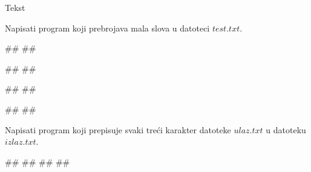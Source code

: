 \begin{Exercise}[label=v3_06] 
Tekst
\end{Exercise}
\begin{Answer}[ref=v3_06]
\end{Answer}







\begin{Exercise}[label=p3_] 
Napisati program koji prebrojava mala slova u datoteci $test.txt$. \\
\begin{miditest}
\begin{upotreba}{1}
##
##

#\naslovIzlaz#
##
\end{upotreba}
\end{miditest}
\begin{miditest}
\begin{upotreba}{2}
##
##

#\naslovIzlaz#
##
\end{upotreba}
\end{miditest}
\end{Exercise}
\begin{Answer}[ref=p3_]
\end{Answer}

\begin{Exercise}[label=p3_] 
Napisati program koji prepisuje svaki treći karakter datoteke $ulaz.txt$ u datoteku $izlaz.txt$.\\
\begin{miditest}
\begin{upotreba}{1}
##
##
##
##
\end{upotreba}
\end{miditest}

\end{Exercise}
\begin{Answer}[ref=p3_]
\end{Answer}

